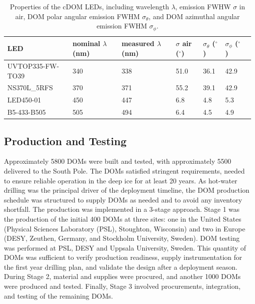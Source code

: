 \begin{table}
\caption{Properties of the cDOM LEDs, including wavelength $\lambda$,
  emission FWHW $\sigma$ in air, DOM polar
  angular emission FWHM $\sigma_{\theta}$, and DOM azimuthal angular emission
  FWHM $\sigma_{\phi}$.}
\begin{tabularx}{\linewidth}{lXXXXXX}
\toprule
 LED& nominal $\lambda$ (nm) & measured $\lambda$ (nm) & $\sigma$ air ($^{\circ}$) &
 $\sigma_{\theta}$ ($^{\circ}$) & $\sigma_{\phi}$ ($^{\circ}$)\\
\midrule
UVTOP335-FW-TO39 & 340 & 338 & 51.0 & 36.1 & 42.9 \\
NS370L\_5RFS & 370 & 371 & 55.2 & 39.1 & 42.9 \\
LED450-01 & 450 & 447 &	6.8 & 4.8 &	5.3 \\
B5-433-B505 & 505 & 494 & 6.4 &	4.5 & 4.9 \\
\bottomrule
\end{tabularx}
\label{table:cdom_properties}
\end{table}

\subsection{\label{sec:dom_prodtest}Production and Testing}

Approximately 5800 DOMs were built and tested, with
approximately 5500 delivered to the South Pole. The DOMs satisfied
stringent requirements, needed to ensure reliable operation in the deep ice
for at least 20 years. As hot-water drilling was the principal 
driver of the deployment timeline, the DOM production schedule was
structured to supply DOMs as needed and to avoid any inventory shortfall.
The production was implemented in a 3-stage approach. Stage 1 was
the production of the initial 400 DOMs at three sites: one in the United
States (Physical Sciences Laboratory (PSL), Stoughton, Wisconsin) and two
in Europe (DESY, Zeuthen, Germany, and Stockholm University,
Sweden). DOM testing was performed at PSL, DESY and Uppsala University,
Sweden. This
quantity of DOMs was sufficient to verify production readiness, supply
instrumentation for the first year drilling plan, and validate the design after a deployment
season.  During Stage 2, material and supplies were procured, and another
1000 DOMs were produced and tested. Finally, Stage 3 involved procurements,
integration, and testing of the remaining DOMs.

